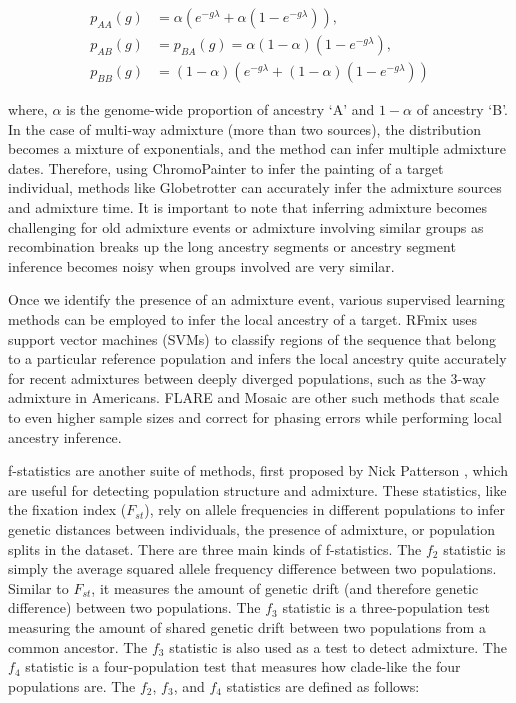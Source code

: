 \begin{equation}
\begin{aligned}
    p_{AA}(g) &= \alpha ( e^{-g\lambda} + \alpha (1-e^{-g\lambda} )), \\
    p_{AB}(g) &= p_{BA}(g) = \alpha (1 - \alpha) (1 - e^{-g\lambda}), \\
    p_{BB}(g) &= (1-\alpha) ( e^{-g\lambda} + (1-\alpha) (1-e^{-g\lambda} ))
\end{aligned}
\end{equation}

where, $\alpha$ is the genome-wide proportion of ancestry `A' and $1-\alpha$ of ancestry `B'. In the case of multi-way admixture (more than two sources), the distribution becomes a mixture of exponentials, and the method can infer multiple admixture dates. Therefore, using ChromoPainter to infer the painting of a target individual, methods like Globetrotter can accurately infer the admixture sources and admixture time. It is important to note that inferring admixture becomes challenging for old admixture events or admixture involving similar groups as recombination breaks up the long ancestry segments or ancestry segment inference becomes noisy when groups involved are very similar.

Once we identify the presence of an admixture event, various supervised learning methods can be employed to infer the local ancestry of a target. RFmix \cite{maples2013rfmix} uses support vector machines (SVMs) to classify regions of the sequence that belong to a particular reference population and infers the local ancestry quite accurately for recent admixtures between deeply diverged populations, such as the 3-way admixture in Americans. FLARE \cite{browning2023fast} and Mosaic \cite{salter2019fine} are other such methods that scale to even higher sample sizes and correct for phasing errors while performing local ancestry inference.

f-statistics are another suite of methods, first proposed by Nick Patterson \cite{reich2009reconstructing,reich2012reconstructing,patterson2012ancient,haak2015massive,durand2011testing}, which are useful for detecting population structure and admixture. These statistics, like the fixation index (\(F_{st}\)), rely on allele frequencies in different populations to infer genetic distances between individuals, the presence of admixture, or population splits in the dataset. There are three main kinds of f-statistics. The \(f_2\) statistic is simply the average squared allele frequency difference between two populations. Similar to \(F_{st}\), it measures the amount of genetic drift (and therefore genetic difference) between two populations. The \(f_3\) statistic is a three-population test measuring the amount of shared genetic drift between two populations from a common ancestor. The \(f_3\) statistic is also used as a test to detect admixture. The \(f_4\) statistic is a four-population test that measures how clade-like the four populations are. The \(f_2\), \(f_3\), and \(f_4\) statistics are defined as follows:

